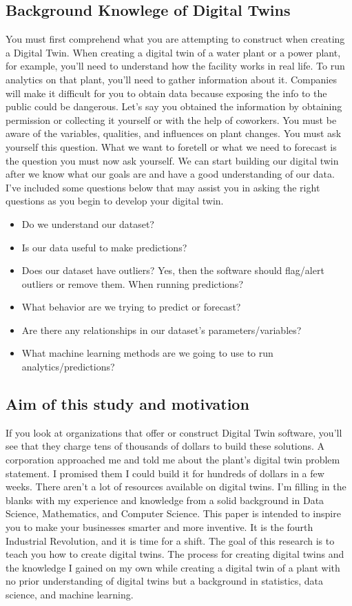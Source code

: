 \subsection{Background Knowlege of Digital Twins}
You must first comprehend what you are attempting to construct when creating a Digital Twin. When creating a digital twin of a water plant or a power plant, for example, you'll need to understand how the facility works in real life. To run analytics on that plant, you'll need to gather information about it. Companies will make it difficult for you to obtain data because exposing the info to the public could be dangerous. Let's say you obtained the information by obtaining permission or collecting it yourself or with the help of coworkers. You must be aware of the variables, qualities, and influences on plant changes. You must ask yourself this question. What we want to foretell or what we need to forecast is the question you must now ask yourself. We can start building our digital twin after we know what our goals are and have a good understanding of our data. I've included some questions below that may assist you in asking the right questions as you begin to develop your digital twin.

\begin{itemize}
    \item	Do we understand our dataset?
    \item	Is our data useful to make predictions?
    \item	Does our dataset have outliers? Yes, then the software should flag/alert outliers or remove them. When running predictions?
    \item	What behavior are we trying to predict or forecast?
    \item	Are there any relationships in our dataset’s parameters/variables?
    \item	What machine learning methods are we going to use to run analytics/predictions?
\end{itemize}
    
\subsection{Aim of this study and motivation}
If you look at organizations that offer or construct Digital Twin software, you'll see that they charge tens of thousands of dollars to build these solutions. A corporation approached me and told me about the plant's digital twin problem statement. I promised them I could build it for hundreds of dollars in a few weeks. There aren't a lot of resources available on digital twins. I'm filling in the blanks with my experience and knowledge from a solid background in Data Science, Mathematics, and Computer Science. This paper is intended to inspire you to make your businesses smarter and more inventive. It is the fourth Industrial Revolution, and it is time for a shift. The goal of this research is to teach you how to create digital twins. The process for creating digital twins and the knowledge I gained on my own while creating a digital twin of a plant with no prior understanding of digital twins but a background in statistics, data science, and machine learning.

